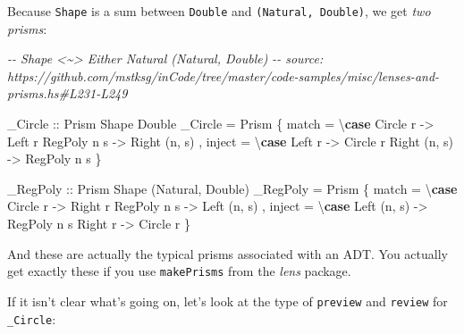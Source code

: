 \documentclass[]{article}
\newenvironment{Shaded}{}{}
\newcommand{\CommentTok}[1]{\textcolor[rgb]{0.38,0.63,0.69}{\textit{#1}}}
\newcommand{\DataTypeTok}[1]{\textcolor[rgb]{0.56,0.13,0.00}{#1}}
\newcommand{\KeywordTok}[1]{\textcolor[rgb]{0.00,0.44,0.13}{\textbf{#1}}}
\newcommand{\NormalTok}[1]{#1}
\newcommand{\OtherTok}[1]{\textcolor[rgb]{0.00,0.44,0.13}{#1}}
\begin{document}
Because \texttt{Shape} is a sum between \texttt{Double} and
\texttt{(Natural,\ Double)}, we get \emph{two prisms}:

\begin{Shaded}
\begin{Highlighting}[]
\CommentTok{{-}{-} Shape <\textasciitilde{}> Either Natural (Natural, Double)}
\CommentTok{{-}{-} source: https://github.com/mstksg/inCode/tree/master/code{-}samples/misc/lenses{-}and{-}prisms.hs\#L231{-}L249}

\OtherTok{\_Circle ::} \DataTypeTok{Prism\textquotesingle{}} \DataTypeTok{Shape} \DataTypeTok{Double}
\NormalTok{\_Circle }\OtherTok{=} \DataTypeTok{Prism\textquotesingle{}}
\NormalTok{    \{ match  }\OtherTok{=}\NormalTok{ \textbackslash{}}\KeywordTok{case}
        \DataTypeTok{Circle}\NormalTok{  r    }\OtherTok{{-}>} \DataTypeTok{Left}\NormalTok{ r}
        \DataTypeTok{RegPoly}\NormalTok{ n s  }\OtherTok{{-}>} \DataTypeTok{Right}\NormalTok{ (n, s)}
\NormalTok{    , inject }\OtherTok{=}\NormalTok{ \textbackslash{}}\KeywordTok{case}
        \DataTypeTok{Left}\NormalTok{   r     }\OtherTok{{-}>} \DataTypeTok{Circle}\NormalTok{ r}
        \DataTypeTok{Right}\NormalTok{ (n, s) }\OtherTok{{-}>} \DataTypeTok{RegPoly}\NormalTok{ n s}
\NormalTok{    \}}

\OtherTok{\_RegPoly ::} \DataTypeTok{Prism\textquotesingle{}} \DataTypeTok{Shape}\NormalTok{ (}\DataTypeTok{Natural}\NormalTok{, }\DataTypeTok{Double}\NormalTok{)}
\NormalTok{\_RegPoly }\OtherTok{=} \DataTypeTok{Prism\textquotesingle{}}
\NormalTok{    \{ match  }\OtherTok{=}\NormalTok{ \textbackslash{}}\KeywordTok{case}
        \DataTypeTok{Circle}\NormalTok{  r    }\OtherTok{{-}>} \DataTypeTok{Right}\NormalTok{ r}
        \DataTypeTok{RegPoly}\NormalTok{ n s  }\OtherTok{{-}>} \DataTypeTok{Left}\NormalTok{ (n, s)}
\NormalTok{    , inject }\OtherTok{=}\NormalTok{ \textbackslash{}}\KeywordTok{case}
        \DataTypeTok{Left}\NormalTok{  (n, s) }\OtherTok{{-}>} \DataTypeTok{RegPoly}\NormalTok{ n s}
        \DataTypeTok{Right}\NormalTok{  r     }\OtherTok{{-}>} \DataTypeTok{Circle}\NormalTok{ r}
\NormalTok{    \}}
\end{Highlighting}
\end{Shaded}

And these are actually the typical prisms associated with an ADT. You actually
get exactly these if you use \texttt{makePrisms} from the \emph{lens} package.

If it isn't clear what's going on, let's look at the type of \texttt{preview}
and \texttt{review} for \texttt{\_Circle}:
\end{document}
